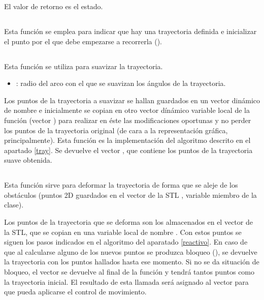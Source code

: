 El valor de retorno es el estado.

\subsection{}

\noindent
{}

\noindent
Esta función se emplea para indicar que hay una trayectoria definida e inicializar el punto por el que debe empezarse a recorrerla ().

\subsection{}

\noindent
{}

\noindent
Esta función se utiliza para suavizar la trayectoria.
\begin{itemize}
  \item {}: radio del arco con el que se suavizan los ángulos de la trayectoria.
\end{itemize}

\noindent
Los puntos de la trayectoria a suavizar se hallan guardados en un vector dinámico de nombre  e inicialmente se copian en otro vector dínámico variable local de la función (vector ) para realizar en éste las modificaciones oportunas y no perder los puntos de la trayectoria original (de cara a la representación gráfica, principalmente).
Esta función es la implementación del algoritmo descrito en el apartado \ref{tray}. Se devuelve el vector , que contiene los puntos de la trayectoria suave obtenida.

\subsection{}

\noindent
{}

\noindent
Esta función sirve para deformar la trayectoria de forma que se aleje de los obstáculos (puntos 2D guardados en el vector de la STL , variable miembro de la clase).

\noindent
Los puntos de la trayectoria que se deforma son los almacenados en el vector  de la STL, que se copian en una variable local de nombre . Con estos puntos se siguen los pasos indicados en el algoritmo del aparatado \ref{reactivo}. En caso de que al calcularse alguno de los nuevos puntos se produzca bloqueo (), se devuelve la trayectoria  con los puntos hallados hasta ese momento. Si no se da situación de bloqueo, el vector  se devuelve al final de la función y tendrá tantos puntos como la trayectoria inicial. El resultado de esta llamada será asignado al vector  para que pueda aplicarse el control de movimiento.

